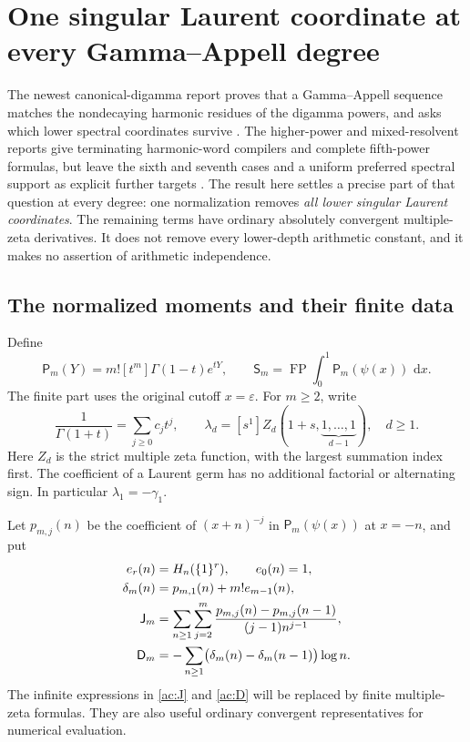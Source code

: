 \documentclass[11pt,a4paper]{article}
\numberwithin{equation}{section}
\theoremstyle{definition}
\theoremstyle{remark}
\DeclareMathOperator{\FP}{FP}
\newcommand{\dd}{\,\mathrm d}
\begin{document}


\section{One singular Laurent coordinate at every Gamma--Appell degree}
\label{ac:section}

The newest canonical-digamma report proves that a Gamma--Appell sequence
matches the nondecaying harmonic residues of the digamma powers, and
asks which lower spectral coordinates survive
\cite{Fifth}. The higher-power and mixed-resolvent reports give
terminating harmonic-word compilers and complete fifth-power formulas,
but leave the sixth and seventh cases and a uniform preferred spectral
support as explicit further targets \cite{Higher,Mixed}.
The result here settles a precise part of that question at every degree:
one normalization removes \emph{all lower singular Laurent coordinates}.
The remaining terms have ordinary absolutely convergent multiple-zeta
derivatives. It does not remove every lower-depth arithmetic constant,
and it makes no assertion of arithmetic independence.

\subsection{The normalized moments and their finite data}

Define
\begin{equation}\label{ac:appell}
 \mathsf P_m(Y)=m![t^m]\Gamma(1-t)e^{tY},\qquad
 \mathsf S_m=\FP\int_0^1\mathsf P_m(\psi(x))\,\dd x.
\end{equation}
The finite part uses the original cutoff $x=\varepsilon$.
For $m\ge2$, write
\begin{equation}\label{ac:coordinates}
 \frac1{\Gamma(1+t)}=\sum_{j\ge0}c_jt^j,
 \qquad
 \lambda_d=[s^1]Z_d(1+s,\underbrace{1,\ldots,1}_{d-1}),
 \quad d\ge1.
\end{equation}
Here $Z_d$ is the strict multiple zeta function, with the largest
summation index first. The coefficient of a Laurent germ has no
additional factorial or alternating sign. In particular
$\lambda_1=-\gamma_1$.

Let $p_{m,j}(n)$ be the coefficient of $(x+n)^{-j}$ in
$\mathsf P_m(\psi(x))$ at $x=-n$, and put
\begin{align}
 e_r(n)&=H_n(\{1\}^r),\qquad e_0(n)=1,\notag\\
 \delta_m(n)&=p_{m,1}(n)+m!e_{m-1}(n),\label{ac:defect}\\
 \mathsf J_m&=\sum_{n\ge1}\sum_{j=2}^m
       \frac{p_{m,j}(n)-p_{m,j}(n-1)}{(j-1)n^{j-1}},
       \label{ac:J}\\
 \mathsf D_m&=-\sum_{n\ge1}
                \bigl(\delta_m(n)-\delta_m(n-1)\bigr)\log n.
       \label{ac:D}
\end{align}
The infinite expressions in \eqref{ac:J} and \eqref{ac:D} will be
replaced by finite multiple-zeta formulas. They are also useful
ordinary convergent representatives for numerical evaluation.
\end{document}
